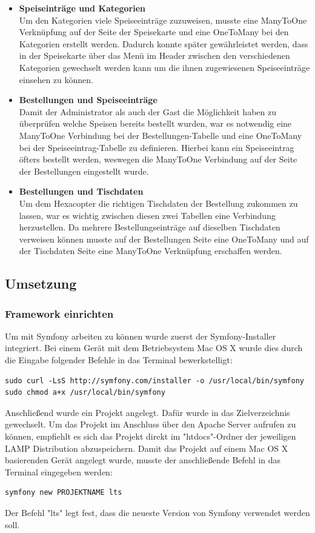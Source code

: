 \begin{itemize}
    \item \textbf{Speiseinträge und Kategorien}\\
Um den Kategorien viele Speiseeinträge zuzuweisen, musste eine ManyToOne Verknüpfung auf der Seite der Speisekarte und eine OneToMany bei den Kategorien erstellt werden. Dadurch konnte später gewährleistet werden, dass in der Speisekarte über das Menü im Header zwischen den verschiedenen Kategorien gewechselt werden kann um die ihnen zugewiesenen Speiseeinträge einsehen zu können.
    \item \textbf{Bestellungen und Speiseeinträge}\\
Damit der Administrator als auch der Gast die Möglichkeit haben zu überprüfen welche Speisen bereits bestellt wurden, war es notwendig eine ManyToOne Verbindung bei der Bestellungen-Tabelle und eine OneToMany bei der Speiseeintrag-Tabelle zu definieren. Hierbei kann ein Speiseeintrag öfters bestellt werden, weswegen die ManyToOne Verbindung auf der Seite der Bestellungen eingestellt wurde.
    \item \textbf{Bestellungen und Tischdaten}\\
Um dem Hexacopter die richtigen Tischdaten der Bestellung zukommen zu lassen, war es wichtig zwischen diesen zwei Tabellen eine Verbindung herzustellen. Da mehrere Bestellungseinträge auf dieselben Tischdaten verweisen können musste auf der Bestellungen Seite eine OneToMany und auf der Tischdaten Seite eine ManyToOne Verknüpfung erschaffen werden.
  \end{itemize}

  \subsection{Umsetzung}

    \subsubsection{Framework einrichten}

Um mit Symfony arbeiten zu können wurde zuerst der Symfony-Installer integriert. Bei einem Gerät mit dem Betriebsystem Mac OS X wurde dies durch die Eingabe folgender Befehle in das Terminal bewerkstelligt:
	\lstset{language = bash}
  	\begin{lstlisting}
sudo curl -LsS http://symfony.com/installer -o /usr/local/bin/symfony
sudo chmod a+x /usr/local/bin/symfony
  	\end{lstlisting}
Anschließend wurde ein Projekt angelegt. Dafür wurde in das Zielverzeichnis gewechselt. Um das Projekt im Anschluss über den Apache Server aufrufen zu können, empfiehlt es sich das Projekt direkt im "htdocs"-Ordner der jeweiligen LAMP Distribution abzuspeichern. Damit das Projekt auf einem Mac OS X basierenden Gerät angelegt wurde, musste der anschließende Befehl in das Terminal eingegeben werden:
	\lstset{language = bash}
  	\begin{lstlisting}
symfony new PROJEKTNAME lts
  	\end{lstlisting}
Der Befehl "lts" legt fest, dass die neueste Version von Symfony verwendet werden soll.

